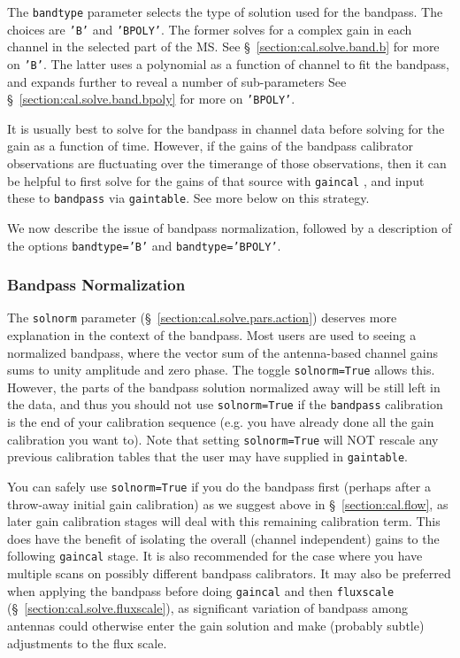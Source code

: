 The {\tt bandtype} parameter selects the type of solution used for the
bandpass.  The choices are {\tt 'B'} and {\tt 'BPOLY'}.  The former 
solves for a complex gain in each channel in the selected part of the
MS. See \S~\ref{section:cal.solve.band.b} for more on {\tt 'B'}.
The latter uses a polynomial as a function of channel to fit the
bandpass, and expands further to reveal a number of sub-parameters
See \S~\ref{section:cal.solve.band.bpoly} for more on {\tt 'BPOLY'}.

It is usually best to solve for the bandpass in channel data before
solving for the gain as a function of time.  However, if the gains of
the bandpass calibrator observations are fluctuating over the
timerange of those observations, then it can be helpful to first solve
for the gains of that source with {\tt gaincal} , and input these to
{\tt bandpass} via {\tt gaintable}.  See more below on this strategy.

We now describe the issue of bandpass normalization, followed by
a description of the options {\tt bandtype='B'} and {\tt bandtype='BPOLY'}.

\subsubsection{Bandpass Normalization}
\label{section:cal.solve.band.solnorm}

The {\tt solnorm} parameter (\S~\ref{section:cal.solve.pars.action})
deserves more explanation in the context of the bandpass.  Most users
are used to seeing a normalized bandpass, where the vector sum of the
antenna-based channel gains sums to unity amplitude and zero phase.
The toggle {\tt solnorm=True} allows this.  However, the parts of the
bandpass solution normalized away will be still left in the data,
and thus you should not use {\tt solnorm=True} if the {\tt bandpass}
calibration is the end of your calibration sequence (e.g. you have
already done all the gain calibration you want to).  Note that
setting {\tt solnorm=True} will NOT rescale any previous calibration
tables that the user may have supplied in {\tt gaintable}.

You can safely use {\tt solnorm=True} if you do the bandpass first
(perhaps after a throw-away initial gain calibration) as we suggest above in
\S~\ref{section:cal.flow}, as later gain calibration stages will deal with this
remaining calibration term.  This does have the benefit of isolating
the overall (channel independent) gains to the following {\tt gaincal}
stage.  It is also recommended for the case where you have multiple
scans on possibly different bandpass calibrators.  It may also be 
preferred when applying the bandpass before doing {\tt gaincal} and 
then {\tt fluxscale} (\S~\ref{section:cal.solve.fluxscale}), 
as significant variation of bandpass among antennas could otherwise 
enter the gain solution and make (probably subtle) adjustments to the
flux scale.

